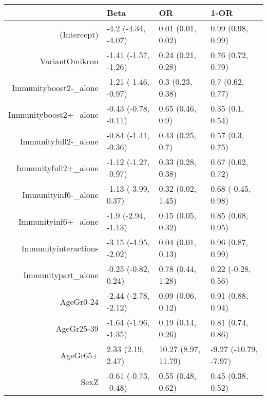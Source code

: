 \begin{table}[ht]
\centering
\begin{tabular}{rlll}
  \hline
 & Beta & OR & 1-OR \\ 
  \hline
(Intercept) & -4.2 (-4.34, -4.07) & 0.01 (0.01, 0.02) & 0.99 (0.98, 0.99) \\ 
  VariantOmikron & -1.41 (-1.57, -1.26) & 0.24 (0.21, 0.28) & 0.76 (0.72, 0.79) \\ 
  Immunityboost2-\_alone & -1.21 (-1.46, -0.97) & 0.3 (0.23, 0.38) & 0.7 (0.62, 0.77) \\ 
  Immunityboost2+\_alone & -0.43 (-0.78, -0.11) & 0.65 (0.46, 0.9) & 0.35 (0.1, 0.54) \\ 
  Immunityfull2-\_alone & -0.84 (-1.41, -0.36) & 0.43 (0.25, 0.7) & 0.57 (0.3, 0.75) \\ 
  Immunityfull2+\_alone & -1.12 (-1.27, -0.97) & 0.33 (0.28, 0.38) & 0.67 (0.62, 0.72) \\ 
  Immunityinf6-\_alone & -1.13 (-3.99, 0.37) & 0.32 (0.02, 1.45) & 0.68 (-0.45, 0.98) \\ 
  Immunityinf6+\_alone & -1.9 (-2.94, -1.13) & 0.15 (0.05, 0.32) & 0.85 (0.68, 0.95) \\ 
  Immunityinteractions & -3.15 (-4.95, -2.02) & 0.04 (0.01, 0.13) & 0.96 (0.87, 0.99) \\ 
  Immunitypart\_alone & -0.25 (-0.82, 0.24) & 0.78 (0.44, 1.28) & 0.22 (-0.28, 0.56) \\ 
  AgeGr0-24 & -2.44 (-2.78, -2.12) & 0.09 (0.06, 0.12) & 0.91 (0.88, 0.94) \\ 
  AgeGr25-39 & -1.64 (-1.96, -1.35) & 0.19 (0.14, 0.26) & 0.81 (0.74, 0.86) \\ 
  AgeGr65+ & 2.33 (2.19, 2.47) & 10.27 (8.97, 11.79) & -9.27 (-10.79, -7.97) \\ 
  SexZ & -0.61 (-0.73, -0.48) & 0.55 (0.48, 0.62) & 0.45 (0.38, 0.52) \\ 
   \hline
\end{tabular}
\end{table}
